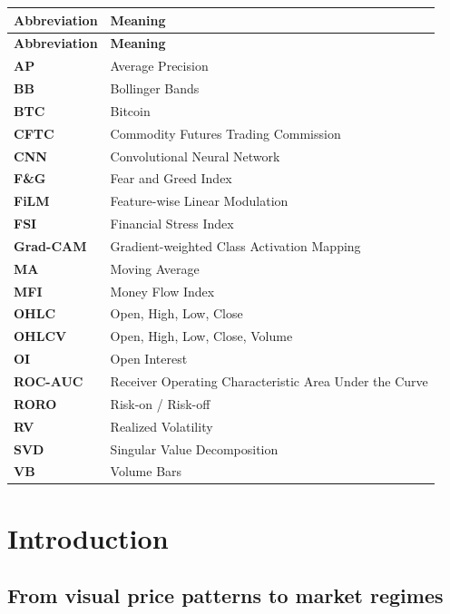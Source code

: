 \documentclass[14pt,a4paper]{extarticle}
\begin{document}
\vspace{0.25cm}
\begin{center}
\begin{longtable}{>{\bfseries}p{}p{}}
\toprule
\textbf{Abbreviation} & \textbf{Meaning}\\
\midrule
\endfirsthead
\toprule
\textbf{Abbreviation} & \textbf{Meaning}\\
\midrule
\endhead
AP & Average Precision\\
BB & Bollinger Bands\\
BTC & Bitcoin\\
CFTC & Commodity Futures Trading Commission\\
CNN & Convolutional Neural Network\\
F\&G & Fear and Greed Index\\
FiLM & Feature-wise Linear Modulation\\
FSI & Financial Stress Index\\
Grad-CAM & Gradient-weighted Class Activation Mapping\\
MA & Moving Average\\
MFI & Money Flow Index\\
OHLC & Open, High, Low, Close\\
OHLCV & Open, High, Low, Close, Volume\\
OI & Open Interest\\
ROC-AUC & Receiver Operating Characteristic Area Under the Curve\\
RORO & Risk-on / Risk-off\\
RV & Realized Volatility\\
SVD & Singular Value Decomposition\\
VB & Volume Bars\\
\bottomrule
\end{longtable}
\end{center}

\setcounter{table}{0}

\clearpage

\section{Introduction}

\subsection{From visual price patterns to market regimes}
\end{document}
